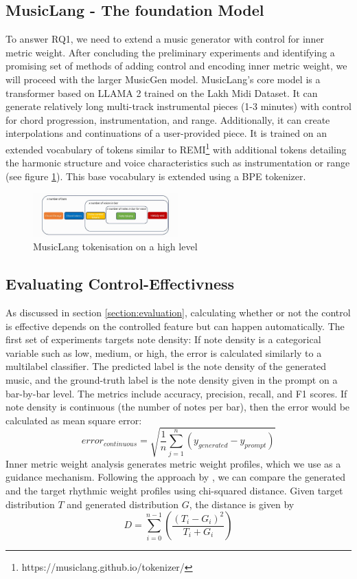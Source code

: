 \subsection{MusicLang - The foundation Model}
To answer RQ1, we need to extend a music generator with control for inner metric weight. After concluding the preliminary experiments and identifying a promising set of methods of adding control and encoding inner metric weight, we will proceed with the larger MusicGen model. 
MusicLang's core model is a transformer based on LLAMA 2 trained on the Lakh Midi Dataset\cite{Raffel_2016}. It can generate relatively long multi-track instrumental pieces (1-3 minutes) with control for chord progression, instrumentation, and range. Additionally, it can create interpolations and continuations of a user-provided piece. It is trained on an extended vocabulary of tokens similar to REMI\footnote{https://musiclang.github.io/tokenizer/} with additional tokens detailing the harmonic structure and voice characteristics such as instrumentation or range (see figure \ref{fig:musiclangtok}). This base vocabulary is extended using a BPE tokenizer. 

\begin{figure}[H]
    \centering
    \includegraphics[width=0.5\textwidth]{IMAGES/MusicLang.JPG} 
    \caption{MusicLang tokenisation on a high level}
    \label{fig:musiclangtok}
\end{figure}

\subsection{Evaluating Control-Effectivness}
As discussed in section \ref{section:evaluation}, calculating whether or not the control is effective depends on the controlled feature but can happen automatically. 
The first set of experiments targets note density: If note density is a categorical variable such as low, medium, or high, the error is calculated similarly to a multilabel classifier. The predicted label is the note density of the generated music, and the ground-truth label is the note density given in the prompt on a bar-by-bar level. 
The metrics include accuracy, precision, recall, and F1 scores. 
If note density is continuous (the number of notes per bar), then the error would be calculated as mean square error: 
\begin{equation}
 error_{continuous} = \sqrt{\frac{1}{n}\sum_{j=1}^{n}(y_{generated}-y_{prompt})}
\end{equation}
Inner metric weight analysis generates metric weight profiles, which we use as a guidance mechanism. Following the approach by \cite{Bemman2024}, we can compare the generated and the target rhythmic weight profiles using chi-squared distance.
Given target distribution $T$ and generated distribution $G$, the distance is given by 
\begin{equation}
D=\sum_{i=0}^{n-1}(\frac{(T_i-G_i)^2}{T_i+G_i})
\end{equation}

